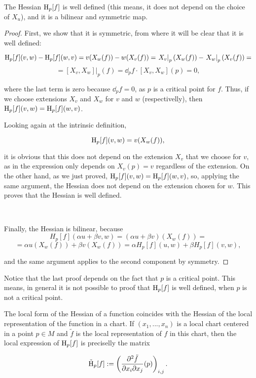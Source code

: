 \begin{lema}
	The Hessian $\operatorname H_p[f]$ is well defined (this means, it does not depend on the choice of $X_u$), and it is a bilinear and symmetric map.
\end{lema}

\begin{proof}
	First, we show that it is symmetric, from where it will be clear that it is well defined:

$$\operatorname H_p[f](v,w) - \operatorname H_p[f](w,v) = v(X_w(f)) - w(X_v(f)) = \left. X_v \right|_p(X_w(f)) - \left. X_w \right|_p (X_v(f)) = $$ 
$$= \left. [X_v,X_w] \right|_p(f) = \dd_p f \cdot [X_v,X_w](p) = 0 ,$$

where the last term is zero because $\dd_p f = 0$, as $p$ is a critical point for $f$. Thus, if we choose extensions $X_v$ and $X_w$ for $v$ and $w$ (respectivelly), then $\operatorname H_p[f](v,w) = \operatorname H_p[f](w,v)$.

Looking again at the intrinsic definition,

$$\operatorname H_p[f](v,w) = v(X_w(f)),$$

it is obvious that this does not depend on the extension $X_v$ that we choose for $v$, as in the expression only depends on $X_v(p) = v$ regardless of the extension. On the other hand, as we just proved, $\operatorname H_p[f](v,w) = \operatorname H_p[f](w,v)$, so, applying the same argument, the Hessian does not depend on the extension chosen for $w$. This proves that the Hessian is well defined.

\

Finally, the Hessian is bilinear, because
$$H_p[f](\alpha u + \beta v, w) = (\alpha u + \beta v)(X_w(f)) = $$
$$= \alpha u(X_w(f)) + \beta v(X_w(f)) = \alpha H_p[f](u,w) + \beta H_p[f](v,w) ,$$

and the same argument applies to the second component by symmetry.
\end{proof}

Notice that the last proof depends on the fact that $p$ is a critical point. This means, in general it is not possible to proof that $\operatorname H_p[f]$ is well defined, when $p$ is not a critical point.

\begin{rmrk}
	The local form of the Hessian of a function coincides with the Hessian of the local representation of the function in a chart. If $(x_1,...,x_n)$ is a local chart centered in a point $p \in M$ and $\tilde{f}$ is the local representation of $f$ in this chart, then the local expression of $\operatorname H_p[f]$ is preciselly the matrix

\begin{displaymath}
	\tilde{\operatorname H}_p[f] := \left( \frac{\partial^2 \tilde{f}}{\partial x_i \partial x_j}(p) \right)_{i,j} .
\end{displaymath}
\end{rmrk}

